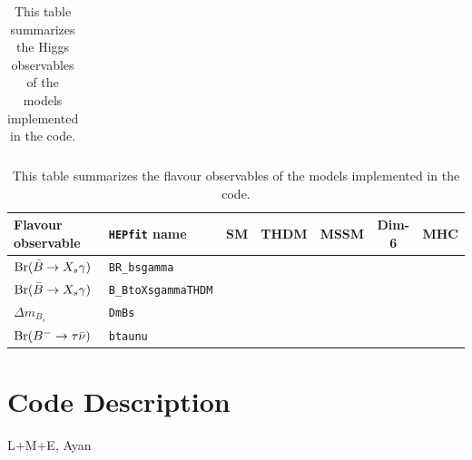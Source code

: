 \documentclass[aps,superscriptaddress,nofootinbib,floatfix,notitlepage]{revtex4-1}
\newcommand{\HEPfit}{\texttt{HEPfit}\xspace}
\begin{document}
\begin{table}
\begin{tabular}{|l|l|c|c|c|c|c|}
  \end{tabular}
  \caption{This table summarizes the Higgs observables of the models
    implemented in the code.}
  \label{tab:summaryhiggs}
\end{table}

\begin{table}
  \centering
  \begin{tabular}{|l|l|c|c|c|c|c|}
    \hline
    \textbf{Flavour observable} & \textbf{\HEPfit name} & \textbf{SM} & \textbf{THDM} & \textbf{MSSM} & \textbf{Dim-6} & \textbf{MHC} \\
    \hline
	${\rm Br}(\bar{B}\to X_s\gamma)$ & \tt{BR\_bsgamma} & \checkmark & & & &\\
    \hline
	${\rm Br}(\bar{B}\to X_s\gamma)$ & \tt{B\_BtoXsgammaTHDM} & & \checkmark & & &\\
    \hline
	$\Delta m_{B_s}$ & \tt{DmBs} & \checkmark & \checkmark & & &\\
    \hline
	${\rm Br}(B^-\to \tau \bar{\nu})$ & \tt{btaunu} & \checkmark & \checkmark & & &\\
    \hline
  \end{tabular}
  \caption{This table summarizes the flavour observables of the models
    implemented in the code.}
  \label{tab:summaryflavour}
\end{table}

\section{Code Description}
\label{sec:Code}

L+M+E, Ayan
\end{document}
